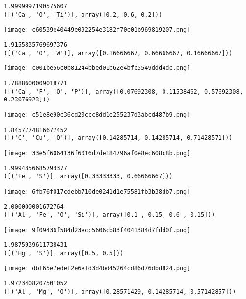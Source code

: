 \begin{lstlisting}
1.9999997190575607
([('Ca', 'O', 'Ti')], array([0.2, 0.6, 0.2]))
\end{lstlisting}

\texttt{[image: c60539e40449e092254e3182f70c01b969819207.png]}

\begin{lstlisting}
1.9155835769697376
([('Ca', 'O', 'W')], array([0.16666667, 0.66666667, 0.16666667]))
\end{lstlisting}

\texttt{[image: c001be56c0b81244bbed01b62e4bfc5549ddd4dc.png]}

\begin{lstlisting}
1.7888600009018771
([('Ca', 'F', 'O', 'P')], array([0.07692308, 0.11538462, 0.57692308, 0.23076923]))
\end{lstlisting}

\texttt{[image: c51e8e90c36cd20ccc8dd1e255237d3abcd487b9.png]}

\begin{lstlisting}
1.8457774816677452
([('C', 'Cu', 'O')], array([0.14285714, 0.14285714, 0.71428571]))
\end{lstlisting}

\texttt{[image: 33e5f6064136f6016d7de184796af0e8ec608c8b.png]}

\begin{lstlisting}
1.9994356685793377
([('Fe', 'S')], array([0.33333333, 0.66666667]))
\end{lstlisting}

\texttt{[image: 6fb76f017cdebb710de0241d1e75581fb3b38db7.png]}

\begin{lstlisting}
2.000000001672764
([('Al', 'Fe', 'O', 'Si')], array([0.1 , 0.15, 0.6 , 0.15]))
\end{lstlisting}

\texttt{[image: 9f09436f584d23ecc5606cb83f4041384d7fdd0f.png]}

\begin{lstlisting}
1.9875939611738431
([('Hg', 'S')], array([0.5, 0.5]))
\end{lstlisting}

\texttt{[image: dbf65e7edef2e6efd3d4bd45264cd86d76dbd824.png]}

\begin{lstlisting}
1.9723408207501052
([('Al', 'Mg', 'O')], array([0.28571429, 0.14285714, 0.57142857]))
\end{lstlisting}

